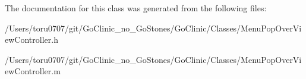 The documentation for this class was generated from the following files:\begin{DoxyCompactItemize}
\item 
/Users/toru0707/git/GoClinic\_\-no\_\-GoStones/GoClinic/Classes/MenuPopOverViewController.h\item 
/Users/toru0707/git/GoClinic\_\-no\_\-GoStones/GoClinic/Classes/MenuPopOverViewController.m\end{DoxyCompactItemize}
